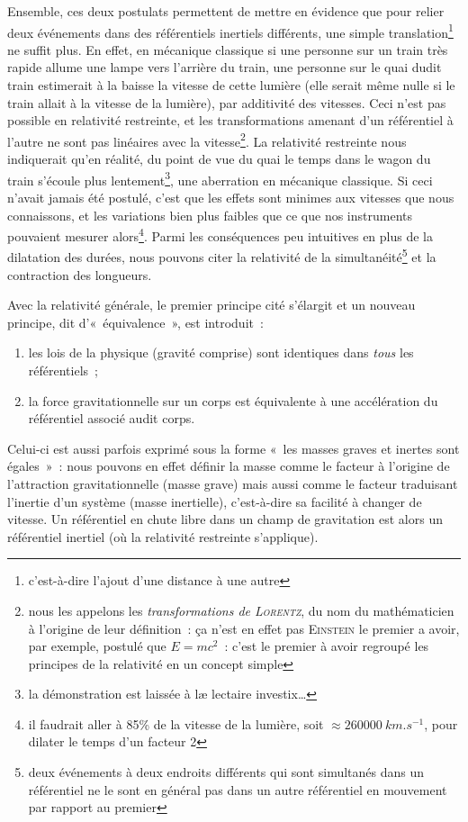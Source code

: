 \documentclass[../main/main.tex]{subfiles}
\begin{document}
Ensemble, ces deux postulats permettent de mettre en évidence que pour relier
deux événements dans des référentiels inertiels différents, une simple
translation\footnote{c'est-à-dire l'ajout d'une distance à une autre} ne suffit
plus. En effet, en mécanique classique si une personne sur un train très rapide
allume une lampe vers l'arrière du train, une personne sur le quai dudit train
estimerait à la baisse la vitesse de cette lumière (elle serait même nulle si le
train allait à la vitesse de la lumière), par additivité des vitesses. Ceci
n'est pas possible en relativité restreinte, et les transformations amenant d'un
référentiel à l'autre ne sont pas linéaires avec la vitesse\footnote{nous les
appelons les \textit{transformations de \textsc{Lorentz}}, du nom du
mathématicien à l'origine de leur définition~: ça n'est en effet pas
\textsc{Einstein} le premier a avoir, par exemple, postulé que $E = mc^2$~:
c'est le premier à avoir regroupé les principes de la relativité en un
concept simple}. La relativité restreinte nous indiquerait qu'en réalité, du
point de vue du quai le temps dans le wagon du train s'écoule plus
lentement\footnote{la démonstration est laissée à læ lectaire investix…}, une
aberration en mécanique classique. Si ceci n'avait jamais été postulé, c'est que
les effets sont minimes aux vitesses que nous connaissons, et les variations
bien plus faibles que ce que nos instruments pouvaient mesurer alors\footnote{il
faudrait aller à 85\% de la vitesse de la lumière, soit $\approx
\SI{260000}{km.s^{-1}}$, pour dilater le temps d'un facteur 2}. Parmi les
conséquences peu intuitives en plus de la dilatation des durées, nous pouvons citer
la relativité de la simultanéité\footnote{deux événements à deux endroits
différents qui sont simultanés dans un référentiel ne le sont en général pas
dans un autre référentiel en mouvement par rapport au premier} et la contraction
des longueurs.

Avec la relativité générale, le premier principe cité s'élargit et un nouveau
principe, dit d'«~équivalence~», est introduit~:
\begin{enumerate}
    \item les lois de la physique (gravité comprise) sont identiques dans
        \textit{tous} les référentiels~;
    \item la force gravitationnelle sur un corps est équivalente à une
        accélération du référentiel associé audit corps.
\end{enumerate}
Celui-ci est aussi parfois exprimé sous la forme «~les masses graves et inertes
sont égales~»~: nous pouvons en effet définir la masse comme le facteur à
l'origine de l'attraction gravitationnelle (masse grave) mais aussi comme le
facteur traduisant l'inertie d'un système (masse inertielle), c'est-à-dire sa
facilité à changer de vitesse. Un référentiel en chute libre dans un champ de
gravitation est alors un référentiel inertiel (où la relativité restreinte
s'applique).
\end{document}
